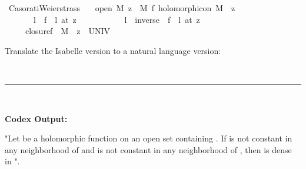 \documentclass{article}
\begin{document}
\begin{boxB}
\begin{isabelle}
\isamarkupfalse \ Casorati{\isacharunderscore}{\kern0pt}Weierstrass{\isacharcolon}{\kern0pt}\isanewline
\ \ \ {\isachardoublequoteopen}open\ M{\isachardoublequoteclose}\ {\isachardoublequoteopen}z\ {\isasymin}\ M{\isachardoublequoteclose}\ {\isachardoublequoteopen}f\ holomorphic{\isacharunderscore}{\kern0pt}on\ {\isacharparenleft}{\kern0pt}M\ {\isacharminus}{\kern0pt}\ {\isacharbraceleft}{\kern0pt}z{\isacharbraceright}{\kern0pt}{\isacharparenright}{\kern0pt}{\isachardoublequoteclose}\isanewline
\ \ \ \ \ \ \ {\isachardoublequoteopen}{\isasymAnd}l{\isachardot}{\kern0pt}\ {\isasymnot}\ {\isacharparenleft}{\kern0pt}f\ {\isasymlonglongrightarrow}\ l{\isacharparenright}{\kern0pt}\ {\isacharparenleft}{\kern0pt}at\ z{\isacharparenright}{\kern0pt}{\isachardoublequoteclose}\ \isanewline
\ \ \ \ \ \ \ \ \ \ {\isachardoublequoteopen}{\isasymAnd}l{\isachardot}{\kern0pt}\ {\isasymnot}\ {\isacharparenleft}{\kern0pt}{\isacharparenleft}{\kern0pt}inverse\ {\isasymcirc}\ f{\isacharparenright}{\kern0pt}\ {\isasymlonglongrightarrow}\ l{\isacharparenright}{\kern0pt}\ {\isacharparenleft}{\kern0pt}at\ z{\isacharparenright}{\kern0pt}{\isachardoublequoteclose}\isanewline
\ \ \ \ \ {\isachardoublequoteopen}closure{\isacharparenleft}{\kern0pt}f\ {\isacharbackquote}{\kern0pt}\ {\isacharparenleft}{\kern0pt}M\ {\isacharminus}{\kern0pt}\ {\isacharbraceleft}{\kern0pt}z{\isacharbraceright}{\kern0pt}{\isacharparenright}{\kern0pt}{\isacharparenright}{\kern0pt}\ {\isacharequal}{\kern0pt}\ UNIV{\isachardoublequoteclose}
\end{isabelle}
Translate the Isabelle version to a natural language version:

\
\hrule
\

\textbf{Codex Output:}

"Let  be a holomorphic function on an open set  containing . If  is not constant in any neighborhood of  and  is not constant in any neighborhood of , then  is dense in ".
\end{boxB}
\end{document}
